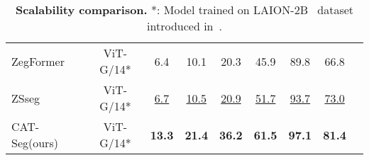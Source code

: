 \documentclass[10pt,twocolumn,letterpaper]{article}
\newcommand{\hlrow}{\rowcolor{black!6}}
\newcommand{\ours}{CAT-Seg\xspace}
\begin{document}
\begin{table}[t]
{\begin{tabular}{l|c|ccccccc}
        \midrule
        ZegFormer~\cite{ding2022decoupling} & ViT-G/14* & 6.4 & 10.1 & 20.3 & 45.9 & 89.8 & 66.8 \\
        ZSseg~\cite{xu2022simple} & ViT-G/14* & \underline{6.7} & \underline{10.5} & \underline{20.9} & \underline{51.7} & \underline{93.7} & \underline{73.0}\\
        \hlrow \ours (ours) & ViT-G/14* & \textbf{13.3} & \textbf{21.4} & \textbf{36.2} & \textbf{61.5} & \textbf{97.1} & \textbf{81.4} \\
        \bottomrule
    \end{tabular}
    } 

    \vspace{-5pt}
    \caption{\textbf{Scalability comparison.} *: Model trained on LAION-2B~\cite{schuhmann2022laion} dataset introduced in~\cite{cherti2022reproducible}.}
    \label{tab:scaling-ablation}
    \vspace{-5pt}
\end{table}
\end{document}
